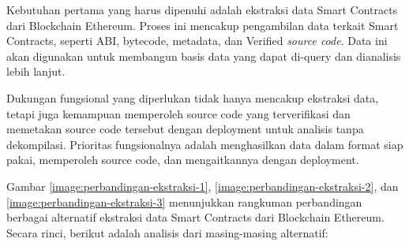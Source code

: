 Kebutuhan pertama yang harus dipenuhi adalah ekstraksi data Smart Contracts dari Blockchain Ethereum. Proses ini mencakup pengambilan data terkait Smart Contracts, seperti ABI, bytecode, metadata, dan Verified \textit{source code}. Data ini akan digunakan untuk membangun basis data yang dapat di-query dan dianalisis lebih lanjut.

Dukungan fungsional yang diperlukan tidak hanya mencakup ekstraksi data, tetapi juga kemampuan memperoleh source code yang terverifikasi dan memetakan source code tersebut dengan deployment untuk analisis tanpa dekompilasi. Prioritas fungsionalnya adalah menghasilkan data dalam format siap pakai, memperoleh source code, dan mengaitkannya dengan deployment. 

Gambar \ref{image:perbandingan-ekstraksi-1}, \ref{image:perbandingan-ekstraksi-2}, dan \ref{image:perbandingan-ekstraksi-3} menunjukkan rangkuman perbandingan berbagai alternatif ekstraksi data Smart Contracts dari Blockchain Ethereum. Secara rinci, berikut adalah analisis dari masing-masing alternatif:

